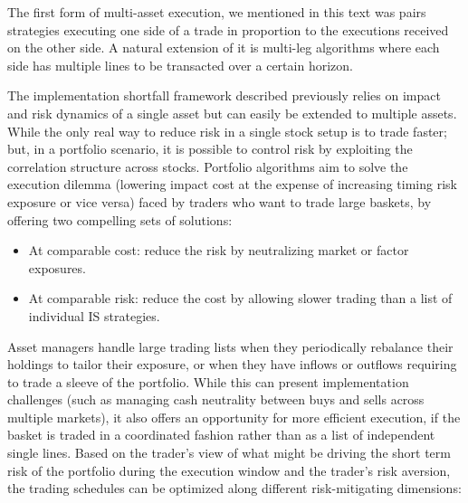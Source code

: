

The first form of multi-asset execution, we mentioned in this text was pairs strategies executing one side of a trade in proportion to the executions received on the other side. A natural extension of it is multi-leg algorithms where each side has multiple lines to be transacted over a certain horizon.


The implementation shortfall framework described previously relies on impact and risk dynamics of a single asset but can easily be extended to multiple assets. While the only real way to reduce risk in a single stock setup is to trade faster; but, in a portfolio scenario, it is possible to control risk by exploiting the correlation structure across stocks. Portfolio algorithms aim to solve the execution dilemma (lowering impact cost at the expense of increasing timing risk exposure or vice versa) faced by traders who want to trade large baskets, by offering two compelling sets of solutions:

        \begin{itemize}
        \item At comparable cost: reduce the risk by neutralizing market or factor exposures. 
        \item At comparable risk: reduce the cost by allowing slower trading than a list of individual IS strategies.
        \end{itemize}


Asset managers handle large trading lists when they periodically rebalance their holdings to tailor their exposure, or when they have inflows or outflows requiring to trade a sleeve of the portfolio. While this can present implementation challenges (such as managing cash neutrality between buys and sells across multiple markets), it also offers an opportunity for more efficient execution, if the basket is traded in a coordinated fashion rather than as a list of independent single lines. Based on the trader's view of what might be driving the short term risk of the portfolio during the execution window and the trader's risk aversion, the trading schedules can be optimized along different risk-mitigating dimensions:


